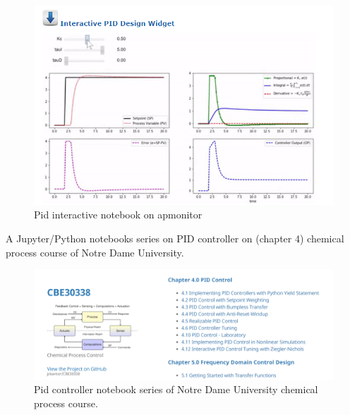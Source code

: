 \begin{figure}[H]
	\centering
	\includegraphics[width=0.8\columnwidth]{Pictures/PID_interactive.png}
	\caption[Short title]{Pid interactive notebook on apmonitor}
	\label{figure:interactive notebook}
\end{figure}

\newpage

A Jupyter/Python notebooks series on PID controller on (chapter 4) chemical process course of Notre Dame University\cite{CBE}.

\begin{figure}[H]
	\centering
	\includegraphics[width=0.8\columnwidth]{Pictures/PID_NotreDame.png}
	\caption[Short title]{Pid controller notebook series of Notre Dame University chemical process course.}
	\label{figure:NotreDame notebook}
\end{figure}

\newpage